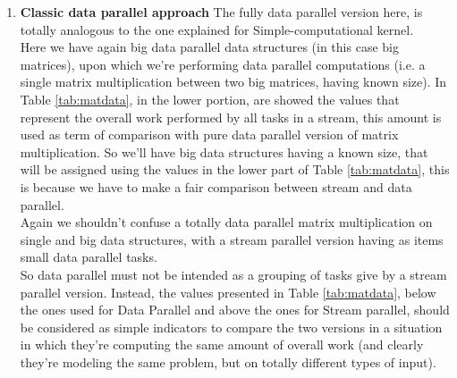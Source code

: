 	
\begin{enumerate}
	\item \textbf{Classic data parallel approach}
	The fully data parallel version here, is totally analogous to the one explained for Simple-computational kernel.\\
	Here we have again big data parallel data structures (in this case big matrices), upon which we're performing data parallel computations (i.e. a single matrix multiplication between two big matrices, having known size).
	In Table \ref{tab:matdata}, in the lower portion, are showed the values that represent the overall work performed by all tasks in a stream, this amount is used as term of comparison with pure data parallel version of matrix multiplication.
	So we'll have big data structures having a known size, that will be assigned using the values in the lower part of Table \ref{tab:matdata}, this is because we have to make a fair comparison between stream and data parallel. \\
	Again we shouldn't confuse a totally data parallel matrix multiplication on single and big data structures, with a stream parallel version having as items small data parallel tasks.\\
	So data parallel must not be intended as a grouping of tasks give by a stream parallel version.
	Instead, the values presented in Table \ref{tab:matdata}, below the ones used for Data Parallel and above the ones for Stream parallel, should be considered as simple indicators to compare the two versions in a situation in which they're computing the same amount of overall work (and clearly they're modeling the same problem, but on totally different types of input).
	
	
	
	
	
	
	
	
	

\end{enumerate}
